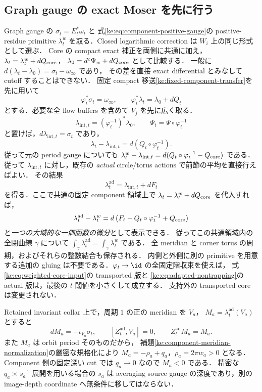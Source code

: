 \subsection{Graph gauge の exact Moser を先に行う}

Graph gauge の $\sigma_t=E_t^*\omega_t$ と
式\eqref{ke:eq:component-positive-gauge}の positive-residue primitive $\lambda_t^w$
を取る．Closed logarithmic correction は $W_i$ 上の同じ形式として選ぶ．
Core の compact exact 補正を両側に共通に加え，
$\lambda_t=\lambda_t^w+dQ_{\rm core}$，
$\lambda_0=d^c\Psi_w+dQ_{\rm core}$ として比較する．
一般に $d(\lambda_t-\lambda_0)=\sigma_t-\omega_\infty$ であり，
その差を直接 exact differential とみなして cutoff することはできない．
固定 compact 移送\ref{ke:fixed-component-transfer}を先に用いて
\[
 \varphi_t^*\sigma_t=\omega_\infty,
 \qquad \varphi_t^*\lambda_t=\lambda_0+dQ_t
\]
とする．必要な全 flow buffers を含めて $V_j$ を先に広く取る．
\[
 \lambda_{\mathrm{int},t}=(\varphi_t^{-1})^*\lambda_0,
 \qquad \Psi_t=\Psi\circ\varphi_t^{-1}
\]
と置けば，$d\lambda_{\mathrm{int},t}=\sigma_t$ であり，
\begin{equation}\label{ke:eq:transported-core-primitive-periods}
 \lambda_t-\lambda_{\mathrm{int},t}
   =d(Q_t\circ\varphi_t^{-1}).
\end{equation}
従って元の period gauge についても
$\lambda_t^w-\lambda_{\mathrm{int},t}
=d(Q_t\circ\varphi_t^{-1}-Q_{\rm core})$ である．
従って $\lambda_{\mathrm{int},t}$ に対し，既存の \emph{actual} circle/torus actions
で前節の平均を直接行えばよい．
その結果
\[
 \lambda^{\mathrm{ad}}_t=\lambda_{\mathrm{int},t}+dF_t
\]
を得る．ここで共通の固定 component 領域上で
$\lambda_t=\lambda_t^w+dQ_{\rm core}$ を代入すれば，
\begin{equation}\label{ke:eq:adapted-positive-period-exact}
 \lambda^{\mathrm{ad}}_t-\lambda_t^w
 =d\left(F_t-Q_t\circ\varphi_t^{-1}+Q_{\rm core}\right)
\end{equation}
と\emph{一つの大域的な一価函数の微分}として表示できる．
従ってこの共通領域内の全閉曲線 $\gamma$ について
$\int_\gamma\lambda^{\mathrm{ad}}_t=\int_\gamma\lambda_t^w$ である．
全 meridian と corner torus の周期，およびそれらの整数結合も保存される．
内側と外側に別の primitive を用意する追加の gluing は不要である．$\varphi_t\to\id$ の全固定階収束を使えば，
式\eqref{ke:eq:weighted-core-input}の transported 版と
\eqref{ke:eq:adapted-nontrapping}の actual 版は，最後の $t$ 閾値を小さくして成立する．
支持外の transported core は変更されない．

Retained invariant collar 上で，周期 $1$ の正の meridian を $V_a$，
$M_a=\lambda^{\mathrm{ad}}_t(V_a)$ とすると
\[
 dM_a=-\iota_{V_a}\sigma_t,
 \qquad [Z^{\mathrm{ad}}_t,V_a]=0,
 \qquad Z^{\mathrm{ad}}_tM_a=M_a.
\]
また $M_a$ は orbit period そのものだから，
補題\ref{ke:component-meridian-normalization}の厳密な規格化により
$M_a=-\rho_a+q_a$，$\rho_a=2\pi w_a>0$ となる．
Component 側の固定深い cut では $q_a\to0$ なので $M_a<0$ である．
精密な $q_a\asymp s_a^{-1}$ 展開を用いる場合の $s_a$ は averaging source gauge
の深度であり，別の image-depth coordinate へ無条件に移してはならない．

